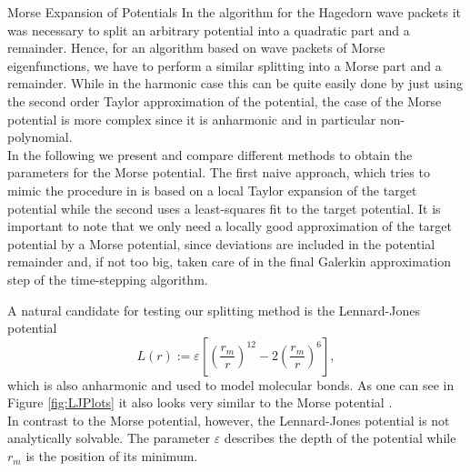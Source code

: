 \begin{chapter}{Morse Expansion of Potentials}
In the algorithm for the Hagedorn wave packets it was necessary to split an arbitrary potential into a quadratic part and a remainder.
Hence, for an algorithm based on wave packets of Morse eigenfunctions, we have to perform a similar splitting into a Morse part and a remainder.
While in the harmonic case this can be quite easily done by just using the second order Taylor approximation of the potential, the case of the
Morse potential is more complex since it is anharmonic and in particular non-polynomial.\\

In the following we present and compare different methods to obtain the parameters for the Morse potential. The first naive approach, which tries to 
mimic the procedure in \cite{FGL_semiclassical_dynamics} is based on a local Taylor expansion of the target potential while the second uses a least-squares fit to
the target potential. It is important to note that we only need a locally good approximation of the target potential by a Morse potential, since
deviations are included in the potential remainder and, if not too big, taken care of in the final Galerkin approximation step of the time-stepping
algorithm.

A natural candidate for testing our splitting method is the Lennard-Jones potential
\begin{equation}
    \label{eq:LennardJonesPot}
    L(r):=\varepsilon\left[\left(\frac{r_m}{r}\right)^{12}-2\left(\frac{r_m}{r}\right)^{6} \right],
\end{equation}
which is also anharmonic and used to model molecular bonds. As one can see in Figure \ref{fig:LJPlots} 
it also looks very similar to the Morse potential .\\

In contrast to the Morse potential, however, the Lennard-Jones potential is not analytically solvable. The parameter $\varepsilon$ describes the depth of the potential while $r_m$ is the position of its minimum.\\


\end{chapter}
